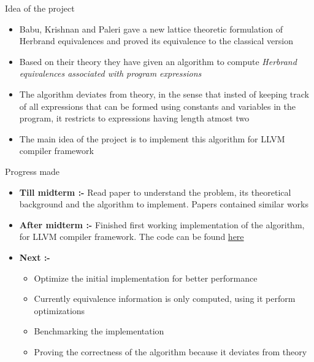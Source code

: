 \documentclass[11pt]{beamer}
\begin{document}
\begin{frame}{Idea of the project}
    \begin{itemize}
        \item Babu, Krishnan and Paleri \cite{Babu} gave a new lattice theoretic formulation of Herbrand equivalences and proved its equivalence to the classical version
        \item Based on their theory they have given an algorithm to compute \textit{Herbrand equivalences associated with program expressions}
        \item The algorithm deviates from theory, in the sense that insted of keeping track of all expressions that can be formed using constants and variables in the program, it restricts to expressions having length atmost two
        \item The main idea of the project is to implement this algorithm for LLVM compiler framework
    \end{itemize}
\end{frame}

\begin{frame}{Progress made}
    \begin{itemize}
        \item \textbf{Till midterm :-} Read paper \cite{Babu} to understand the problem, its theoretical background and the algorithm to implement. Papers \cite{Gulwani,Saleena} contained similar works
        \item \textbf{After midterm :-} Finished first working implementation of the algorithm, for LLVM compiler framework. The code can be found \href{https://github.com/himanshu520/HerbrandEquivalence}{here}
        \item \textbf{Next :-} 
        \begin{itemize}
            \item Optimize the initial implementation for better performance
            \item Currently equivalence information is only computed, using it perform optimizations
            \item Benchmarking the implementation 
            \item Proving the correctness of the algorithm because it deviates from theory
        \end{itemize}
    \end{itemize}
\end{frame}
\end{document}
